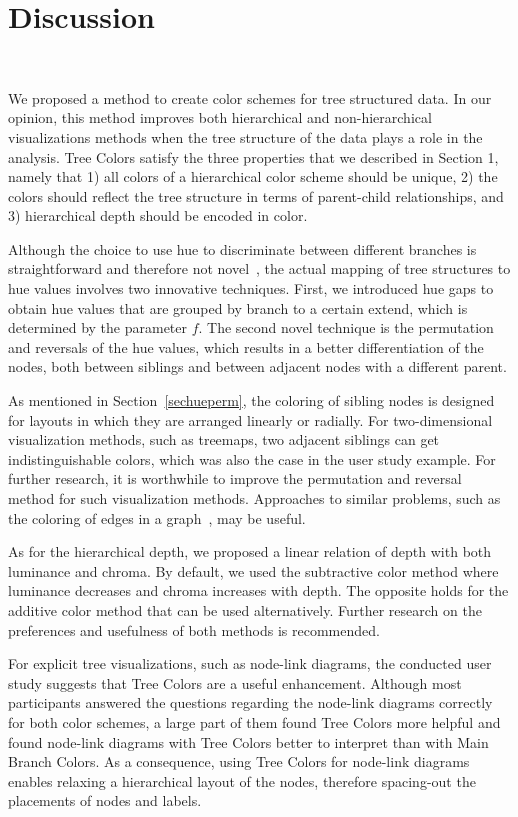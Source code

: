 \documentclass[journal]{vgtc}                %
\begin{document}
\section{Discussion}~\label{secdisc}

We proposed a method to create color schemes for tree structured data. In our opinion, this method improves both hierarchical and non-hierarchical visualizations methods when the tree structure of the data plays a role in the analysis. Tree Colors satisfy the three properties that we described in Section 1, namely that 1) all colors of a hierarchical color scheme should be unique, 2) the colors should reflect the tree structure in terms of parent-child relationships, and 3) hierarchical depth should be encoded in color. 

Although the choice to use hue to discriminate between different branches is straightforward and therefore not novel~\cite{yang2002, lam2012, manyeyes}, the actual mapping of tree structures to hue values involves two innovative techniques. First, we introduced hue gaps to obtain hue values that are grouped by branch to a certain extend, which is determined by the parameter $f$. The second novel technique is the permutation and reversals of the hue values, which results in a better differentiation of the nodes, both between siblings and between adjacent nodes with a different parent.

As mentioned in Section~\ref{sechueperm}, the coloring of sibling nodes is designed for layouts in which they are arranged linearly or radially. For two-dimensional visualization methods, such as treemaps, two adjacent siblings can get indistinguishable colors, which was also the case in the user study example. For further research, it is worthwhile to improve the permutation and reversal method for such visualization methods. Approaches to similar problems, such as the coloring of edges in a graph~\cite{Jianu09}, may be useful.

As for the hierarchical depth, we proposed a linear relation of depth with both luminance and chroma. By default, we used the subtractive color method where luminance decreases and chroma increases with depth. The opposite holds for the additive color method that can be used alternatively. Further research on the preferences and usefulness of both methods is recommended.


For explicit tree visualizations, such as node-link diagrams, the conducted user study suggests that Tree Colors are 
a useful enhancement. Although most participants answered the questions regarding the node-link diagrams correctly for both color schemes, a large part of them found Tree Colors more helpful and found node-link diagrams with Tree Colors better to interpret than with Main Branch Colors. As a consequence, using Tree Colors for node-link diagrams enables relaxing 
a hierarchical layout of the nodes, therefore spacing-out the placements of nodes and labels.
\end{document}
